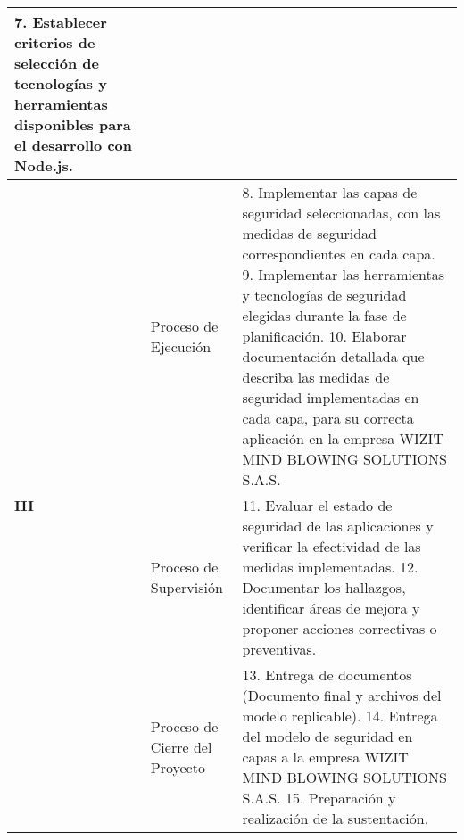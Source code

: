 \begin{longtable}[htbp]{|p{4.055em}|p{11.22em}|p{20em}|}
  7. Establecer criterios de selección de tecnologías y herramientas disponibles para el desarrollo con Node.js. \bigstrut\\
  \hline
  \multirow{3}{*}{\centering\textbf{III}} & Proceso de Ejecución & 
  8. Implementar las capas de seguridad seleccionadas, con las medidas de seguridad correspondientes en cada capa.\newline{}
  9. Implementar las herramientas y tecnologías de seguridad elegidas durante la fase de planificación.\newline{}
  10. Elaborar documentación detallada que describa las medidas de seguridad implementadas en cada capa, para su correcta aplicación en la empresa WIZIT MIND BLOWING SOLUTIONS S.A.S. \bigstrut\\
  \hline
  \multirow{2}{*}{\centering\textbf{IV}} & Proceso de Supervisión & 
  11. Evaluar el estado de seguridad de las aplicaciones y verificar la efectividad de las medidas implementadas.\newline{}
  12. Documentar los hallazgos, identificar áreas de mejora y proponer acciones correctivas o preventivas. \bigstrut\\
  \hline
  \multirow{3}{*}{\centering\textbf{V}} & Proceso de Cierre del Proyecto & 
  13. Entrega de documentos (Documento final y archivos del modelo replicable).\newline{}
  14. Entrega del modelo de seguridad en capas a la empresa WIZIT MIND BLOWING SOLUTIONS S.A.S.\newline{}
  15. Preparación y realización de la sustentación. \bigstrut\\
  \hline
\end{longtable}


\begin{landscape}
  
\end{landscape}